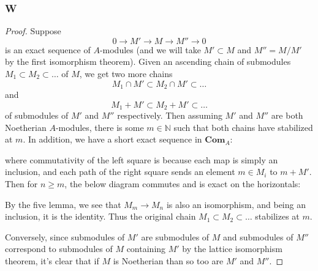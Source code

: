 \documentclass{article}
\newcommand{\N}{\mathbb{N}}
\newcommand{\id}{\mathrm{id}}
\newcommand{\Com}{\mathbf{Com}} %
\begin{document}
\subsubsection{W}\label{3.6.W}
\begin{proof}
    Suppose 
    \[
    0\to M' \to M \to M'' \to 0
    \]
    is an exact sequence of $A$-modules (and we will take $M'\subset M$ and $M''=M/M'$ by the first isomorphism theorem). Given an ascending chain of submodules $M_1\subset M_2 \subset \dots$ of $M$, we get two more chains
    \[
    M_1\cap M' \subset M_2 \cap M' \subset \dots
    \]
    and
    \[
    M_1+M' \subset M_2+M'\subset \dots
    \]
    of submodules of $M'$ and $M''$ respectively. Then assuming $M'$ and $M''$ are both Noetherian $A$-modules, there is some $m\in \N$ such that both chains have stabilized at $m$. In addition, we have a short exact sequence in $\Com_A:$
    \begin{center}
    \end{center}
    where commutativity of the left square is because each map is simply an inclusion, and each path of the right square sends an element $m\in M_i$ to $m+M'$. Then for $n \ge m$, the below diagram commutes and is exact on the horizontals:
    \begin{center}
    \end{center}
    By the five lemma, we see that $M_m\to M_n$ is also an isomorphism, and being an inclusion, it is the identity. Thus the original chain $M_1\subset M_2 \subset \dots $ stabilizes at $m$.

    Conversely, since submodules of $M'$ are submodules of $M$ and submodules of $M''$ correspond to submodules of $M$ containing $M'$ by the lattice isomorphism theorem, it's clear that if $M$ is Noetherian than so too are $M'$ and $M''$.
\end{proof}
\end{document}
